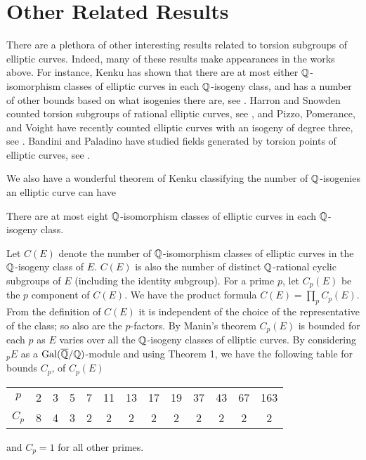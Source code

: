 \section{Other Related Results}

There are a plethora of other interesting results related to torsion subgroups of elliptic curves. Indeed, many of these results make appearances in the works above. For instance, Kenku has shown that there are at most either $\mathbb{Q}$-isomorphism classes of elliptic curves in each $\mathbb{Q}$-isogeny class, and has a number of other bounds based on what isogenies there are, see \cite{kenku82}. Harron and Snowden counted torsion subgroups of rational elliptic curves, see \cite{harronsnowden17}, and Pizzo, Pomerance, and Voight have recently counted elliptic curves with an isogeny of degree three, see \cite{pizzopomerancevoight20}. Bandini and Paladino have studied fields generated by torsion points of elliptic curves, see \cite{bandinipaladino12,bandinipaladino16}.


We also have a wonderful theorem of Kenku classifying the number of $\mathbb{Q}$-isogenies an elliptic curve can have


\begin{thm} \label{thm:kenku}
There are at most eight $\mathbb{Q}$-isomorphism classes of elliptic curves in each $\mathbb{Q}$-isogeny class. 
\end{thm}


Let $C(E)$ denote the number of $\mathbb{Q}$-isomorphism classes of elliptic curves in the $\mathbb{Q}$-isogeny class of $E$. $C(E)$ is also the number of distinct $\mathbb{Q}$-rational cyclic subgroups of $E$ (including the identity subgroup). For a prime $p$, let $C_p(E)$ be the $p$ component of $C(E)$. We have the product formula $C(E)= \prod_p C_p(E)$. From the definition of $C(E)$ it is independent of the choice of the representative of the class; so also are the $p$-factors. By Manin's theorem $C_p(E)$ is bounded for each $p$ as $E$ varies over all the $\mathbb{Q}$-isogeny classes of elliptic curves. By considering $_pE$ as a $\operatorname{Gal}(\overline{\mathbb{Q}}/\mathbb{Q})$-module and using Theorem 1, we have the following table for bounds $C_p$, of $C_p(E)$
	\begin{table}[!ht]
	\centering
	\begin{tabular}{ccccccccccccc}
	$p$ & 2 & 3 & 5 & 7 & 11 & 13 & 17 & 19 & 37 & 43 & 67 & 163 \\ 
	$C_p$ & 8 & 4 & 3 & 2 & 2 & 2 & 2 & 2 & 2 & 2 & 2 & 2
	\end{tabular}
	\end{table}
and $C_p= 1$ for all other primes. 















